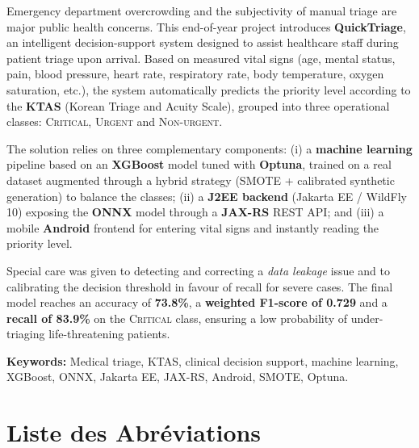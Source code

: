 \documentclass{rapportENSIAS}
\begin{document}
Emergency department overcrowding and the subjectivity of manual triage are major public
health concerns. This end-of-year project introduces \textbf{QuickTriage}, an intelligent
decision-support system designed to assist healthcare staff during patient triage upon
arrival. Based on measured vital signs (age, mental status, pain, blood pressure, heart
rate, respiratory rate, body temperature, oxygen saturation, etc.), the system
automatically predicts the priority level according to the \textbf{KTAS} (Korean Triage
and Acuity Scale), grouped into three operational classes: \textsc{Critical},
\textsc{Urgent} and \textsc{Non-urgent}.

The solution relies on three complementary components: (i) a \textbf{machine learning}
pipeline based on an \textbf{XGBoost} model tuned with \textbf{Optuna}, trained on a real
dataset augmented through a hybrid strategy (SMOTE + calibrated synthetic generation) to
balance the classes; (ii) a \textbf{J2EE backend} (Jakarta EE / WildFly 10) exposing the
\textbf{ONNX} model through a \textbf{JAX-RS} REST API; and (iii) a mobile \textbf{Android}
frontend for entering vital signs and instantly reading the priority level.

Special care was given to detecting and correcting a \textit{data leakage} issue and to
calibrating the decision threshold in favour of recall for severe cases. The final model
reaches an accuracy of \textbf{73.8\%}, a \textbf{weighted F1-score of 0.729} and a
\textbf{recall of 83.9\%} on the \textsc{Critical} class, ensuring a low probability of
under-triaging life-threatening patients.

\vspace{0.4cm}
\noindent\textbf{Keywords:} Medical triage, KTAS, clinical decision support, machine
learning, XGBoost, ONNX, Jakarta EE, JAX-RS, Android, SMOTE, Optuna.

\chapter*{Liste des Abréviations}
\end{document}
